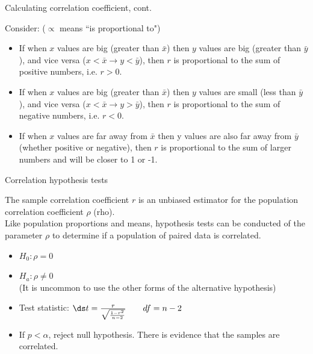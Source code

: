 \documentclass[xcolor=table, aspectratio=169, bigger, handout]{beamer}
\begin{document}
\begin{frame}{Calculating correlation coefficient, cont.}
\begin{block}{}
Consider: ($\propto$ means ``is proportional to")\\
\smallskip
{}
\begin{itemize}
\pause\item If when $x$ values are big (greater than $\bar x$) then $y$ values are big (greater than $\bar y$), and vice versa ($x < \bar x \to y < \bar y$), then $r$ is proportional to the sum of positive numbers, i.e. $r> 0$.
\pause\item If when $x$ values are big (greater than $\bar x$) then $y$ values are small (less than $\bar y$), and vice versa ($x < \bar x \to y > \bar y$), then $r$ is proportional to the sum of negative numbers, i.e. $r < 0$.
\pause\item If when $x$ values are far away from $\bar x$ then y values are also far away from $\bar y$ (whether positive or negative), then $r$ is proportional to the sum of larger numbers and will be closer to 1 or -1.
\end{itemize}
\end{block}
\end{frame}


\begin{frame}{Correlation hypothesis tests}
\begin{block}{}
The sample correlation coefficient $r$ is an unbiased estimator for the population correlation coefficient $\rho$ (rho).\\
\medskip
Like population proportions and means, hypothesis tests can be conducted of the parameter $\rho$ to determine if a population of paired data is correlated.
\begin{itemize}
\pause\item $H_0: \rho = 0$
\pause\item $H_a: \rho \ne 0$\\ (It is uncommon to use the other forms of the alternative hypothesis)
\pause\item Test statistic: $\ds t= \frac r {\sqrt{\frac{1-r^2}{n-2}}} \qquad df = n-2$
\pause\item If $p < \alpha$, reject null hypothesis. There is evidence that the samples are correlated.
\end{itemize}
\end{block}
\end{frame}
\end{document}
